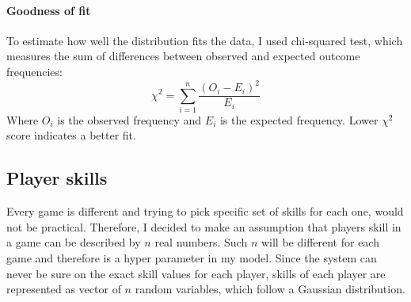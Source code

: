 \documentclass[12pt,a4paper]{book}
\begin{document}
\paragraph{Goodness of fit}
To estimate how well the distribution fits the data, I used chi-squared test, which measures the sum of differences between observed and expected outcome frequencies:
\begin{equation*}
\chi^2 = \sum_{i=1}^{n} \frac{(O_i - E_i)^2}{E_i}
\end{equation*}
Where $O_i$ is the observed frequency and $E_i$ is the expected frequency.
Lower $\chi^2$ score indicates a better fit.
\subsection{Player skills}
Every game is different and trying to pick specific set of skills for each one, would not be practical.
Therefore, I decided to make an assumption that players skill in a game can be described by $n$ real numbers.
Such $n$ will be different for each game and therefore is a hyper parameter in my model.
Since the system can never be sure on the exact skill values for each player, skills of each player are represented as vector of $n$ random variables, which follow a Gaussian distribution.
\end{document}
